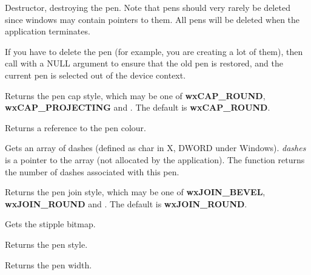Destructor, destroying the pen. Note that pens should very rarely be deleted
since windows may contain pointers to them. All pens will be deleted when the
application terminates.

If you have to delete the pen (for example, you are creating a lot of
them), then call  with a NULL argument
to ensure that the old pen is restored, and the current pen is selected
out of the device context.



Returns the pen cap style, which may be one of {\bf wxCAP\_ROUND}, {\bf wxCAP\_PROJECTING} and
. The default is {\bf wxCAP\_ROUND}.



Returns a reference to the pen colour.



Gets an array of dashes (defined as char in X, DWORD under Windows).
{\it dashes} is a pointer to the array (not allocated by the application).
The function returns the number of dashes associated with this pen.



Returns the pen join style, which may be one of {\bf wxJOIN\_BEVEL}, {\bf wxJOIN\_ROUND} and
. The default is {\bf wxJOIN\_ROUND}.



Gets the stipple bitmap.



Returns the pen style.



Returns the pen width.



